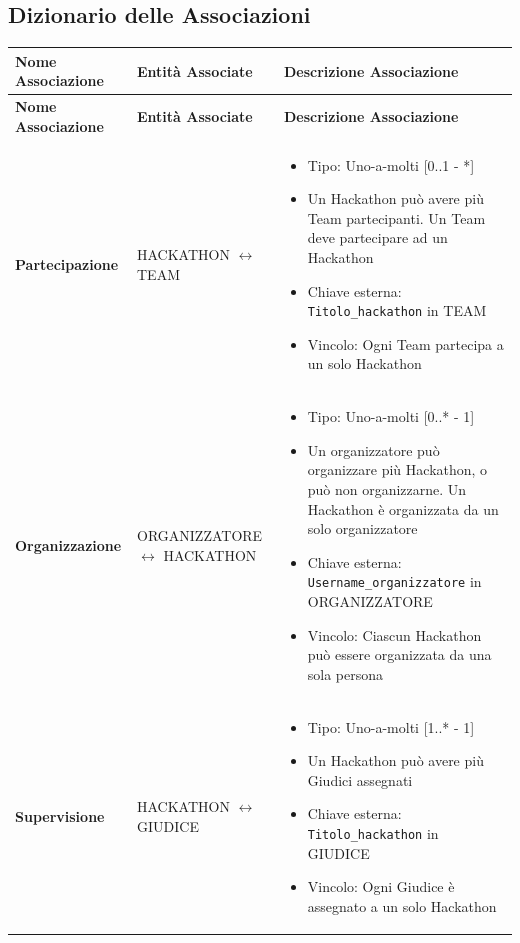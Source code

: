 \documentclass[a4paper, 10pt]{article}
\renewcommand{\arraystretch}{1.2} %
\begin{document}
	\subsection{Dizionario delle Associazioni}
	{\footnotesize
		\setlength{\arrayrulewidth}{0.5pt}
		\renewcommand{\arraystretch}{1.5}
		\begin{longtable}{
				>{\raggedright\arraybackslash}p{4cm} %
				>{\centering\arraybackslash}p{4cm}    %
				>{\raggedright\arraybackslash}p{6.5cm}%
			}
			\hline
			\textbf{Nome Associazione} & \textbf{Entità Associate} & \textbf{Descrizione Associazione} \\
			\hline
			\endfirsthead
			\hline
			\textbf{Nome Associazione} & \textbf{Entità Associate} & \textbf{Descrizione Associazione} \\
			\hline
			\endhead
			\hline
			\endfoot
			\hline
			\endlastfoot
			
			\textbf{Partecipazione}  & 
			HACKATHON $\leftrightarrow$ TEAM &
			\begin{itemize}
				\item Tipo: Uno-a-molti [0..1 - *]
				\item Un Hackathon può avere più Team partecipanti. Un Team deve partecipare ad un Hackathon
				\item Chiave esterna: \texttt{Titolo\_hackathon} in TEAM
				\item Vincolo: Ogni Team partecipa a un solo Hackathon
			\end{itemize} \\
			\hline
			
			\textbf{Organizzazione} & 
			ORGANIZZATORE $\leftrightarrow$ HACKATHON &
			\begin{itemize}
				\item Tipo: Uno-a-molti [0..* - 1]
				\item Un organizzatore può organizzare più Hackathon, o può non organizzarne. Un Hackathon è organizzata da un solo organizzatore
				\item Chiave esterna: \texttt{Username\_organizzatore} in ORGANIZZATORE
				\item Vincolo: Ciascun Hackathon può essere organizzata da una sola persona
			\end{itemize} \\
			\hline
			
			\textbf{Supervisione} & 
			HACKATHON $\leftrightarrow$ GIUDICE &
			\begin{itemize}
				\item Tipo: Uno-a-molti [1..* - 1]
				\item Un Hackathon può avere più Giudici assegnati
				\item Chiave esterna: \texttt{Titolo\_hackathon} in GIUDICE
				\item Vincolo: Ogni Giudice è assegnato a un solo Hackathon
			\end{itemize} \\
			\hline
			

\end{longtable}}
\end{document}
